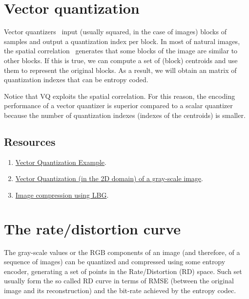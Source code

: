 \section{Vector quantization}

Vector quantizers~\cite{vruiz__vector_quantization} input (usually
squared, in the case of images) blocks of samples and output a
quantization index per block. In most of natural images, the spatial
correlation~\cite{vruiz__visual_redundancy} generates that some blocks
of the image are similar to other blocks. If this is true, we can
compute a set of (block) centroids and use them to represent the
original blocks. As a result, we will obtain an matrix of quantization
indexes that can be entropy coded.

Notice that VQ exploits the spatial correlation. For this reason, the
encoding performance of a vector quantizer is superior compared to a
scalar quantizer because the number of quantization indexes (indexes
of the centroids) is smaller.

\subsection*{Resources}

\begin{enumerate}
\item \href{https://scikit-learn.org/stable/auto_examples/cluster/plot_face_compress.html#sphx-glr-auto-examples-cluster-plot-face-compress-py}{Vector Quantization Example}.
\item
  \href{https://github.com/Sistemas-Multimedia/Sistemas-Multimedia.github.io/blob/master/contents/gray_VQ/gray_VQ.ipynb}{Vector
    Quantization (in the 2D domain) of a gray-scale image}.
\item \href{https://github.com/vicente-gonzalez-ruiz/image_vector_quantization_LBG}{Image compression using LBG}.
\end{enumerate}

\section{The rate/distortion curve}

The gray-scale values or the $\text{RGB}$ components of an image (and
therefore, of a sequence of images) can be quantized and compressed
using some entropy encoder, generating a set of points in the
Rate/Distortion (RD) space. Such set usually form the so called RD
curve in terms of RMSE (between the original image and its
reconstruction) and the bit-rate achieved by the entropy codec.

